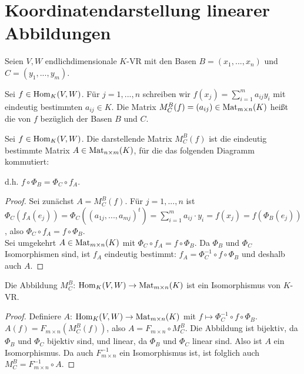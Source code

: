 \section{Koordinatendarstellung linearer Abbildungen}

Seien $V,W$ endlichdimensionale $K$-VR mit den Basen $B=(x_1,...,x_n)$ und $C=(y_1,...,y_m)$.

\begin{definition}
	Sei $f\in \operatorname{Hom}_K(V,W)$. Für $j=1,...,n$ schreiben wir $f(x_j)=\sum_{
		i=1}^m a_{ij}y_i$ mit eindeutig bestimmten $a_{ij}\in K$. Die Matrix $M_C^B(f)=(a_{ij})\in \operatorname{Mat}_{m\times n}(K)$ 
	heißt die  von $f$ bezüglich der Basen $B$ und $C$.
\end{definition}

\begin{proposition}
	Sei $f\in \operatorname{Hom}_K(V,W)$. Die darstellende Matrix $M_C^B(f)$ ist die eindeutig bestimmte Matrix $A\in 
	\operatorname{Mat}_{n\times m}(K)$, für die das folgenden Diagramm kommutiert: \\
	\begin{center}\end{center}
	d.h. $f\circ \Phi_B=\Phi_C\circ f_A$.
\end{proposition}
\begin{proof}
	Sei zunächst $A=M_C^B(f)$. Für $j=1,...,n$ ist $\Phi_C(f_A(e_j))=\Phi_C((a_{1j},...,a_{mj})^t)=\sum_{i=1}^m 
	a_{ij}\cdot y_i=f(x_j)=f(\Phi_B(e_j))$, also $\Phi_C\circ f_A=f \circ \Phi_B$. \\
	Sei umgekehrt $A\in \operatorname{Mat}_{m\times n}(K)$ mit $\Phi_C\circ f_A=f\circ\Phi_B$. Da $\Phi_B$ und $\Phi_C$ Isomorphismen 
	sind, ist $f_A$ eindeutig bestimmt: $f_A=\Phi_C^{-1}\circ f \circ \Phi_B$ und deshalb auch $A$.
\end{proof}

\begin{conclusion}
	Die Abbildung $M_C^B$: $\operatorname{Hom}_K(V,W)\to \operatorname{Mat}_{m\times n}(K)$ ist ein Isomorphismus von $K$-VR.
\end{conclusion}
\begin{proof}
	Definiere $A$: $\operatorname{Hom}_K(V,W)\to \operatorname{Mat}_{m\times n}(K)$ mit $f\mapsto \Phi_C^{-1}\circ f \circ \Phi_B$. $A(f)=F_{m\times n}
	(M_C^B(f))$, also $A=F_{m\times n}\circ M_C^B$. Die Abbildung ist bijektiv, da $\Phi_B$ und $\Phi_C$ bijektiv sind, 
	und linear, da $\Phi_B$ und $\Phi_C$ linear sind. Also ist $A$ ein Isomorphismus. Da auch $F_{m\times n}^{-1}$ ein 
	Isomorphismus ist, ist folglich auch $M_C^B=F_{m\times n}^{-1}\circ A$.
\end{proof}

